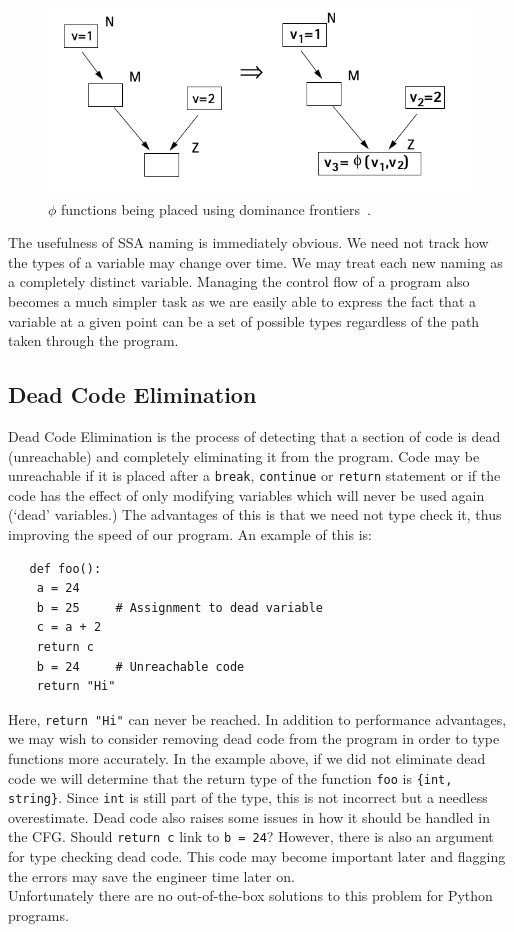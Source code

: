 \documentclass[12pt, titlepage]{article}
\begin{document}
\begin{figure}
	\centering
	\includegraphics[scale=0.6]{images/ssaFrontiers.png}
	\caption{$\phi$ functions being placed using dominance frontiers~\cite{domianceFrontiersImage}.}
	\label{fig:dominanceFrontiers}
\end{figure} 

\indent The usefulness of SSA naming is immediately obvious. We need not track how the types of a variable may change over time. We may treat each new naming as a completely distinct variable. Managing the control flow of a program also becomes a much simpler task as we are easily able to express the fact that a variable at a given point can be a set of possible types regardless of the path taken through the program.

\subsection{Dead Code Elimination}
Dead Code Elimination is the process of detecting that a section of code is dead (unreachable) and completely eliminating it from the program. Code may be unreachable if it is placed after a \texttt{break}, \texttt{continue} or \texttt{return} statement or if the code has the effect of only modifying variables which will never be used again (`dead' variables.) The advantages of this is that we need not type check it, thus improving the speed of our program.
An example of this is:
\begin{lstlisting}
   def foo():
   	a = 24
   	b = 25     # Assignment to dead variable
   	c = a + 2
   	return c
   	b = 24 	   # Unreachable code
   	return "Hi"
\end{lstlisting}
Here, \texttt{return "Hi"} can never be reached. In addition to performance advantages, we may wish to consider removing dead code from the program in order to type functions more accurately. In the example above, if we did not eliminate dead code we will determine that the return type of the function \texttt{foo} is \texttt{\{int, string\}}. Since \texttt{int} is still part of the type, this is not incorrect but a needless overestimate. Dead code also raises some issues in how it should be handled in the CFG. Should \texttt{return c} link to \texttt{b = 24}? However, there is also an argument for type checking dead code. This code may become important later and flagging the errors may save the engineer time later on. \\
\indent Unfortunately there are no out-of-the-box solutions to this problem for Python programs. \\
\end{document}

